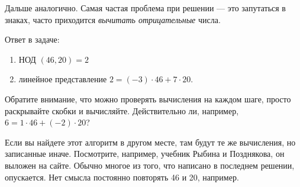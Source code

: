 \documentclass{article}
\begin{document}
    Дальше аналогично. Самая частая проблема при решении — это запутаться в знаках, часто приходится {\em вычитать отрицательные} числа.

    Ответ в задаче:
    \begin{enumerate}
        \item НОД $(46,20) = 2$
        \item линейное представление $2 = (-3)\cdot46+7\cdot20$.
    \end{enumerate}

    Обратите внимание, что можно проверять вычисления на каждом шаге, просто раскрывайте скобки и вычисляйте. Действительно ли, например, $6 = 1\cdot46+(-2)\cdot20$?

    Если вы найдете этот алгоритм в другом месте, там будут те же вычисления, но записанные иначе. Посмотрите, например, учебник Рыбина и Позднякова, он выложен на сайте. Обычно многое из того, что написано в последнем решении, опускается. Нет смысла постоянно повторять 46 и 20, например.
\end{document}
